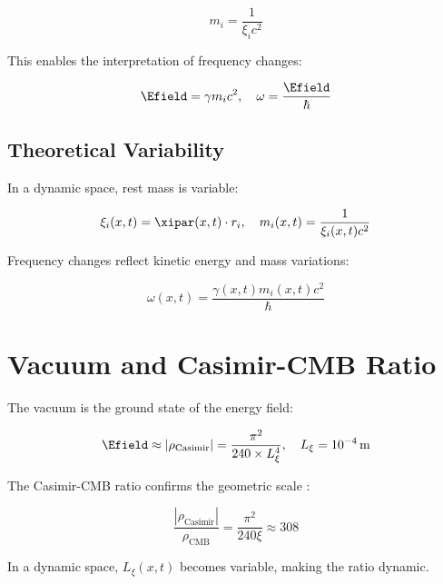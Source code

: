 \begin{equation}
	m_i = \frac{1}{\xi_i c^2}
	\label{eq:rest_mass_fixed}
\end{equation}

This enables the interpretation of frequency changes:

\begin{equation}
	\Efield = \gamma m_i c^2, \quad \omega = \frac{\Efield}{\hbar}
	\label{eq:frequency_interpretation}
\end{equation}

\subsection{Theoretical Variability}
\label{subsec:theoretical_variability}

In a dynamic space, rest mass is variable:

\begin{equation}
	\xi_i(x,t) = \xipar(x,t) \cdot r_i, \quad m_i(x,t) = \frac{1}{\xi_i(x,t) c^2}
	\label{eq:rest_mass_variable}
\end{equation}

Frequency changes reflect kinetic energy and mass variations:

\begin{equation}
	\omega(x,t) = \frac{\gamma(x,t) m_i(x,t) c^2}{\hbar}
	\label{eq:frequency_variable}
\end{equation}

\section{Vacuum and Casimir-CMB Ratio}
\label{sec:vacuum_casimir_cmb}

The vacuum is the ground state of the energy field:

\begin{equation}
	\Efield \approx |\rho_{\text{Casimir}}| = \frac{\pi^2}{240 \times L_\xi^4}, \quad L_\xi = 10^{-4} \, \text{m}
	\label{eq:casimir_energy}
\end{equation}

The Casimir-CMB ratio confirms the geometric scale \cite{Casimir1948, Planck2018}:

\begin{equation}
	\frac{|\rho_{\text{Casimir}}|}{\rho_{\text{CMB}}} = \frac{\pi^2}{240 \xi} \approx 308
	\label{eq:casimir_cmb_ratio}
\end{equation}

In a dynamic space, \(L_\xi(x,t)\) becomes variable, making the ratio dynamic.

